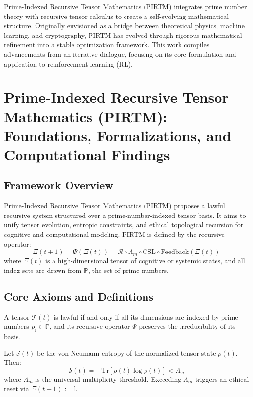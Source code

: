 \documentclass{article}
\theoremstyle{plain}
\begin{document}
Prime-Indexed Recursive Tensor Mathematics (PIRTM) integrates prime number theory with recursive tensor calculus to create a self-evolving mathematical structure. Originally envisioned as a bridge between theoretical physics, machine learning, and cryptography, PIRTM has evolved through rigorous mathematical refinement into a stable optimization framework. This work compiles advancements from an iterative dialogue, focusing on its core formulation and application to reinforcement learning (RL).

\section{Prime-Indexed Recursive Tensor Mathematics (PIRTM): Foundations, Formalizations, and Computational Findings}

\subsection{Framework Overview}
Prime-Indexed Recursive Tensor Mathematics (PIRTM) proposes a lawful recursive system structured over a prime-number-indexed tensor basis. It aims to unify tensor evolution, entropic constraints, and ethical topological recursion for cognitive and computational modeling. PIRTM is defined by the recursive operator:
\[
\Xi(t+1) = \Psi(\Xi(t)) = \mathcal{R} \circ \Lambda_m \circ \text{CSL} \circ \text{Feedback}(\Xi(t))
\]
where $\Xi(t)$ is a high-dimensional tensor of cognitive or systemic states, and all index sets are drawn from $\mathbb{P}$, the set of prime numbers.

\subsection{Core Axioms and Definitions}

\begin{axiom}
A tensor $\mathcal{T}(t)$ is lawful if and only if all its dimensions are indexed by prime numbers $p_i \in \mathbb{P}$, and its recursive operator $\Psi$ preserves the irreducibility of its basis.
\end{axiom}

\begin{axiom}
Let $\mathcal{S}(t)$ be the von Neumann entropy of the normalized tensor state $\rho(t)$. Then:
\[
\mathcal{S}(t) = -\text{Tr}[\rho(t) \log \rho(t)] < \Lambda_m
\]
where $\Lambda_m$ is the universal multiplicity threshold. Exceeding $\Lambda_m$ triggers an ethical reset via $\Xi(t+1) := \mathbb{I}$.
\end{axiom}
\end{document}
